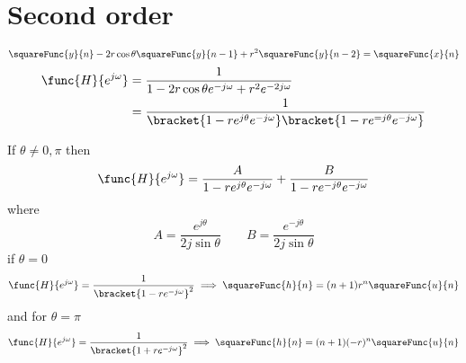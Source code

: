 \section{Second order}
\begin{equation*}
    \squareFunc{y}{n} - 2r \cos \theta \squareFunc{y}{n - 1} + r^2 \squareFunc{y}{n - 2} = \squareFunc{x}{n}
\end{equation*}
\begin{align*}
    \func{H}{e^{j\omega}} &= \dfrac{1}{1 - 2r \cos \theta e^{-j\omega} + r^2 e^{-2j\omega}} \\
    &= \dfrac{1}{\bracket{1 - re^{j\theta} e^{-j\omega}}\bracket{1 - re^{=j\theta} e^{-j\omega}}}
\end{align*}

If \(\theta \neq 0,\pi\) then 
\begin{equation*}
    \func{H}{e^{j\omega}} = \dfrac{A}{1 -re^{j\theta} e^{-j\omega}} + \dfrac{B}{1 -re^{-j\theta} e^{-j\omega}}
\end{equation*}
where
\begin{equation*}
    A = \dfrac{e^{j\theta}}{2j \sin \theta} \qquad B = \dfrac{e^{-j\theta}}{2j \sin\theta}
\end{equation*}
if \(\theta = 0\)
\begin{equation*}
    \func{H}{e^{j\omega}} = \dfrac{1}{\bracket{1 - re^{-j\omega}}^2} \implies \squareFunc{h}{n} = (n + 1)r^n \squareFunc{u}{n} 
\end{equation*}
and for \(\theta = \pi\)
\begin{equation*}
    \func{H}{e^{j\omega}} = \dfrac{1}{\bracket{1 + re^{-j\omega}}^2} \implies \squareFunc{h}{n} = (n + 1)(-r)^n \squareFunc{u}{n} 
\end{equation*}